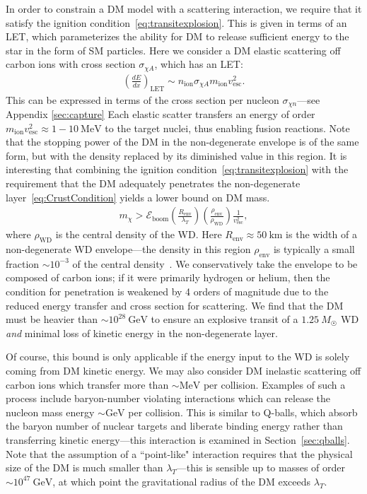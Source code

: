 \documentclass[preprintnumbers,amsmath,amssymb,prd,superscriptaddress]{revtex4}
\newcommand{\Eboom}{\mathcal{E}_\text{boom}}
\newcommand{\GeV}{\text{GeV}}
\def\r{\right)}
\def\l{\left(}
\begin{document}
In order to constrain a DM model with a scattering interaction, we require that it satisfy the ignition condition~\eqref{eq:transitexplosion}.
This is given in terms of an LET, which parameterizes the ability for DM to release sufficient energy to the star in the form of SM particles.
Here we consider a DM elastic scattering off carbon ions with cross section $\sigma_{\chi A}$, which has an LET:
\begin{align}
\label{eq:schematicLET}
  \left( \frac{d E}{d x} \right)_\text{LET} \sim n_\text{ion} \sigma_{\chi A} m_\text{ion} v_\text{esc}^2.
\end{align}
This can be expressed in terms of the cross section per nucleon $\sigma_{\chi n}$---see Appendix \ref{sec:capture}
Each elastic scatter transfers an energy of order $m_\text{ion} v_\text{esc}^2 \approx 1-10~\text{MeV}$ to the target nuclei, thus enabling fusion reactions.
Note that the stopping power of the DM in the non-degenerate envelope is of the same form, but with the density replaced by its diminished value in this region.
It is interesting that combining the ignition condition~\eqref{eq:transitexplosion} with the requirement that the DM adequately penetrates the non-degenerate layer~\eqref{eq:CrustCondition} yields a lower bound on DM mass.
\begin{align}
\label{eq:transitmass}
m_\chi > \Eboom \l \frac{R_\text{env}}{\lambda_T} \r \l \frac{\rho_\text{env}}{\rho_\text{WD}} \r \frac{1}{v_\text{esc}^2},
\end{align}
where $\rho_\text{WD}$ is the central density of the WD.
Here $R_\text{env} \approx 50 ~\text{km}$ is the width of a non-degenerate WD envelope---the density in this region $\rho_\text{env}$ is typically a small fraction $\sim 10^{-3}$ of the central density~\cite{KippenhahnWeigert}.
We conservatively take the envelope to be composed of carbon ions; if it were primarily hydrogen or helium, then the condition for penetration is weakened by 4 orders of magnitude due to the reduced energy transfer and cross section for scattering.
We find that the DM must be heavier than $\sim 10^{28} ~\GeV$ to ensure an explosive transit of a $1.25~M_{\astrosun}$ WD \emph{and} minimal loss of kinetic energy in the non-degenerate layer.

Of course, this bound is only applicable if the energy input to the WD is solely coming from DM kinetic energy.
We may also consider DM inelastic scattering off carbon ions which transfer more than $\sim \text{MeV}$ per collision.
Examples of such a process include baryon-number violating interactions which can release the nucleon mass energy $\sim \GeV$ per collision.
This is similar to Q-balls, which absorb the baryon number of nuclear targets and liberate binding energy rather than transferring kinetic energy---this interaction is examined in Section~\ref{sec:qballs}.
Note that the assumption of a ``point-like" interaction requires that the physical size of the DM is much smaller than $\lambda_T$---this is sensible up to masses of order $\sim 10^{47}~\GeV$, at which point the gravitational radius of the DM exceeds $\lambda_T$.
\end{document}
